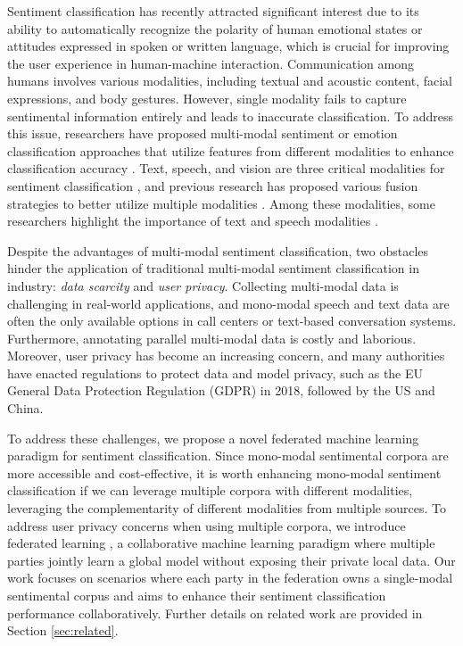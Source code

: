 \documentclass[11pt]{article}
\begin{document}
Sentiment classification has recently attracted significant interest due to its ability to automatically recognize the polarity of human emotional states or attitudes expressed in spoken or written language, which is crucial for improving the user experience in human-machine interaction. Communication among humans involves various modalities, including textual and acoustic content, facial expressions, and body gestures. However, single modality fails to capture sentimental information entirely and leads to inaccurate classification. To address this issue, researchers have proposed multi-modal sentiment or emotion classification approaches that utilize features from different modalities to enhance classification accuracy \cite{li2019acoustic, aguilar2019multimodal}. Text, speech, and vision are three critical modalities for sentiment classification \cite{wollmer2013youtube, rozgic2012ensemble}, and previous research has proposed various fusion strategies to better utilize multiple modalities \cite{zadeh2017tensor, majumder2018multimodal}. Among these modalities, some researchers highlight the importance of text and speech modalities \cite{poria2017context}.

Despite the advantages of multi-modal sentiment classification, two obstacles hinder the application of traditional multi-modal sentiment classification in industry: \textit{data scarcity} and \textit{user privacy}. Collecting multi-modal data is challenging in real-world applications, and mono-modal speech and text data are often the only available options in call centers or text-based conversation systems. Furthermore, annotating parallel multi-modal data is costly and laborious. Moreover, user privacy has become an increasing concern, and many authorities have enacted regulations to protect data and model privacy, such as the EU General Data Protection Regulation (GDPR) \cite{voigt2017the76} in 2018, followed by the US and China.

To address these challenges, we propose a novel federated machine learning paradigm for sentiment classification. Since mono-modal sentimental corpora are more accessible and cost-effective, it is worth enhancing mono-modal sentiment classification if we can leverage multiple corpora with different modalities, leveraging the complementarity of different modalities from multiple sources. To address user privacy concerns when using multiple corpora, we introduce federated learning \cite{yang2019federated}, a collaborative machine learning paradigm where multiple parties jointly learn a global model without exposing their private local data. Our work focuses on scenarios where each party in the federation owns a single-modal sentimental corpus and aims to enhance their sentiment classification performance collaboratively. Further details on related work are provided in Section \ref{sec:related}.
\end{document}
